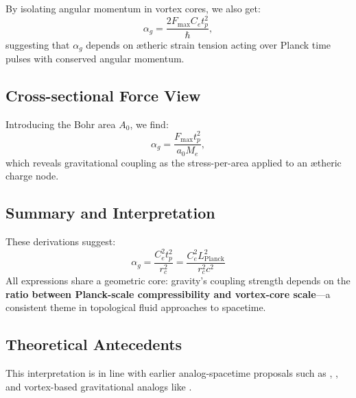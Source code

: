 By isolating angular momentum in vortex cores, we also get:
\[
    \alpha_g = \frac{2 F_{\text{max}} C_e t_p^2}{\hbar},
\]
suggesting that $\alpha_g$ depends on ætheric strain tension acting over Planck time pulses with conserved angular momentum.

\subsection*{Cross-sectional Force View}

Introducing the Bohr area $A_0$, we find:
\[
    \alpha_g = \frac{F_{\text{max}} t_p^2}{a_0 M_e},
\]
which reveals gravitational coupling as the stress-per-area applied to an ætheric charge node.

\subsection*{Summary and Interpretation}

These derivations suggest:
\[
    \boxed{
        \alpha_g = \frac{C_e^2 t_p^2}{r_c^2} = \frac{C_e^2 L_{\text{Planck}}^2}{r_c^2 c^2}
    }
\]
All expressions share a geometric core: gravity’s coupling strength depends on the \textbf{ratio between Planck-scale compressibility and vortex-core scale}—a consistent theme in topological fluid approaches to spacetime.

\subsection*{Theoretical Antecedents}

This interpretation is in line with earlier analog-spacetime proposals such as \cite{barcelo2011}, \cite{volovik2003universe}, and vortex-based gravitational analogs like \cite{ranada1989topological}.

